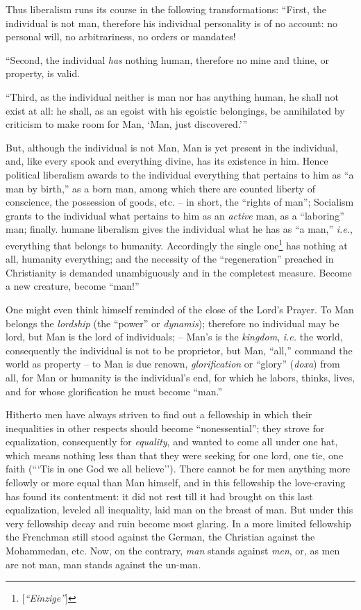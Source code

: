 Thus liberalism runs its course in the following transformations: ``First, 
the individual is not man, therefore his individual personality is of no 
account: no personal will, no arbitrariness, no orders or mandates!

``Second, the individual \textit{has} nothing human, therefore no mine and 
thine, or property, is valid.

``Third, as the individual neither is man nor has anything human, he shall 
not exist at all: he shall, as an egoist with his egoistic belongings, be 
annihilated by criticism to make room for Man, `Man, just discovered.'{}''

But, although the individual is not Man, Man is yet present in the individual, 
and, like every spook and everything divine, has its existence in him. Hence 
political liberalism awards to the individual everything that pertains to him 
as ``a man by birth,'' as a born man, among which there are counted liberty 
of conscience, the possession of goods, etc. -- in short, the ``rights of 
man''; Socialism grants to the individual what pertains to him as an 
\textit{active} man, as a ``laboring'' man; finally. humane liberalism gives 
the individual what he has as ``a man,'' \textit{i.e.}, everything that 
belongs to humanity. Accordingly the single 
one\footnote{[\textit{``Einzige''}]} has nothing at all, humanity 
everything; and the necessity of the ``regeneration'' preached in 
Christianity is demanded unambiguously and in the completest measure. Become a 
new creature, become ``man!''

One might even think himself reminded of the close of the Lord's Prayer. To 
Man belongs the \textit{lordship} (the ``power'' or \textit{dynamis}); 
therefore no individual may be lord, but Man is the lord of individuals; -- 
Man's is the \textit{kingdom}, \textit{i.e.} the world, consequently the 
individual is not to be proprietor, but Man, ``all,'' command the world as 
property -- to Man is due renown, \textit{glorification} or ``glory'' 
(\textit{doxa}) from all, for Man or humanity is the individual's end, for 
which he labors, thinks, lives, and for whose glorification he must become 
``man.''

Hitherto men have always striven to find out a fellowship in which their 
inequalities in other respects should become ``nonessential''; they strove 
for equalization, consequently for \textit{equality}, and wanted to come all 
under one hat, which means nothing less than that they were seeking for one 
lord, one tie, one faith (```Tis in one God we all believe''). There cannot 
be for men anything more fellowly or more equal than Man himself, and in this 
fellowship the love-craving has found its contentment: it did not rest till it 
had brought on this last equalization, leveled all inequality, laid man on the 
breast of man. But under this very fellowship decay and ruin become most 
glaring. In a more limited fellowship the Frenchman still stood against the 
German, the Christian against the Mohammedan, etc. Now, on the contrary, 
\textit{man} stands against \textit{men}, or, as men are not man, man stands 
against the un-man.

